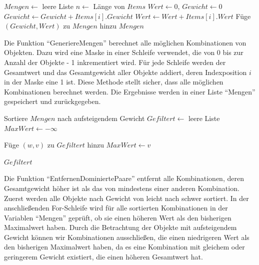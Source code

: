 \begin{algorithmic}
    \State \vspace{0.5em}
    
    \State $Mengen \leftarrow$ leere Liste
    \State $n \leftarrow$ Länge von $Items$
        \State $Wert \leftarrow 0$, $Gewicht \leftarrow 0$
                \State $Gewicht \leftarrow Gewicht + Items[i].Gewicht$
                \State $Wert \leftarrow Wert + Items[i].Wert$
            \EndIf
        \EndFor
        \State Füge $(Gewicht, Wert)$ zu $Mengen$ hinzu
    \EndFor
    \State \Return $Mengen$
    \EndFunction

\end{algorithmic}

Die Funktion \enquote{GeneriereMengen} berechnet alle möglichen Kombinationen von Objekten. Dazu wird eine Maske in einer Schleife verwendet, die von 0 bis zur Anzahl der Objekte - 1 inkrementiert wird. Für jede Schleife werden der Gesamtwert und das Gesamtgewicht aller Objekte addiert, deren Indexposition $ i $ in der Maske eine 1 ist. Diese Methode stellt sicher, dass alle möglichen Kombinationen berechnet werden. Die Ergebnisse werden in einer Liste \enquote{Mengen} gespeichert und zurückgegeben.

\begin{algorithmic}
    \State \vspace{0.5em}

    \State Sortiere $Mengen$ nach aufsteigendem Gewicht
    \State $Gefiltert \leftarrow$ leere Liste
    \State $MaxWert \leftarrow -\infty$
    
            \State Füge $(w, v)$ zu $Gefiltert$ hinzu
            \State $MaxWert \leftarrow v$
        \EndIf
    \EndFor

    \State \Return $Gefiltert$
    \EndFunction

\end{algorithmic}

Die Funktion \enquote{EntfernenDominiertePaare} entfernt alle Kombinationen, deren Gesamtgewicht höher ist als das von mindestens einer anderen Kombination. Zuerst werden alle Objekte nach Gewicht von leicht nach schwer sortiert. In der anschließenden For-Schleife wird für alle sortierten Kombinationen in der Variablen \enquote{Mengen} geprüft, ob sie einen höheren Wert als den bisherigen Maximalwert haben. Durch die Betrachtung der Objekte mit aufsteigendem Gewicht können wir Kombinationen ausschließen, die einen niedrigeren Wert als den bisherigen Maximalwert haben, da es eine Kombination mit gleichem oder geringerem Gewicht existiert, die einen höheren Gesamtwert hat.

